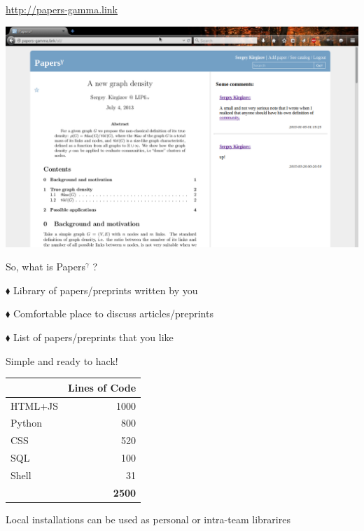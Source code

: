 \documentclass[xcolor=dvipsnames]{beamer}
\begin{document}
\begin{frame}{}
  \url{http://papers-gamma.link}
  \vspace{1em}
  
  \includegraphics[width=1\textwidth]{fig/papers.png}
  \vspace{2em}

\end{frame}

\begin{frame}{So, what is Papers$^\gamma$ ?}


  $\blacklozenge$ Library of papers/preprints written by you
  \vspace{2em}
  
  $\blacklozenge$  Comfortable place to discuss articles/preprints
  \vspace{2em}
  
  $\blacklozenge$ List of papers/preprints  that you like
  
\end{frame}


\begin{frame}{Simple and ready to hack!}

  \begin{center}
    \setlength\extrarowheight{3pt} 
    
    \begin{tabular}{ l  r }
      \bf & \bf Lines of Code  \\\hline
      HTML+JS & 1000 \\ 
      Python   & 800 \\ 
      CSS      & 520 \\ 
      SQL      & 100 \\ 
      Shell      & 31 \\    \hline
      & \bf2500 
    \end{tabular}
  \end{center}
  
  \vspace{1em}
  
  \small Local installations can be used as personal or intra-team librarires
  
\end{frame}
\end{document}
